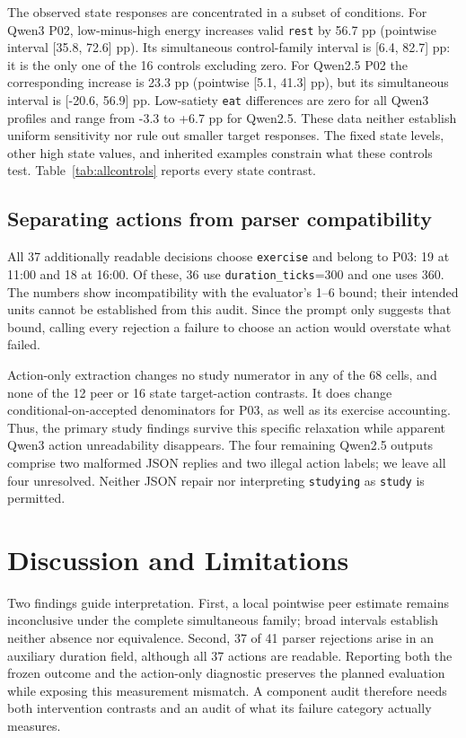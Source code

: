 \documentclass[conference]{IEEEtran}
\newcommand{\code}[1]{\texttt{#1}}
\begin{document}
The observed state responses are concentrated in a subset of conditions. For Qwen3 P02, low-minus-high energy increases valid \code{rest} by 56.7 pp (pointwise interval [35.8, 72.6] pp). Its simultaneous control-family interval is [6.4, 82.7] pp: it is the only one of the 16 controls excluding zero. For Qwen2.5 P02 the corresponding increase is 23.3 pp (pointwise [5.1, 41.3] pp), but its simultaneous interval is [-20.6, 56.9] pp. Low-satiety \code{eat} differences are zero for all Qwen3 profiles and range from -3.3 to +6.7 pp for Qwen2.5. These data neither establish uniform sensitivity nor rule out smaller target responses. The fixed state levels, other high state values, and inherited examples constrain what these controls test. Table~\ref{tab:allcontrols} reports every state contrast.

\subsection{Separating actions from parser compatibility}


All 37 additionally readable decisions choose \code{exercise} and belong to P03: 19 at 11:00 and 18 at 16:00. Of these, 36 use \code{duration\_ticks}=300 and one uses 360. The numbers show incompatibility with the evaluator's 1--6 bound; their intended units cannot be established from this audit. Since the prompt only suggests that bound, calling every rejection a failure to choose an action would overstate what failed.

Action-only extraction changes no study numerator in any of the 68 cells, and none of the 12 peer or 16 state target-action contrasts. It does change conditional-on-accepted denominators for P03, as well as its exercise accounting. Thus, the primary study findings survive this specific relaxation while apparent Qwen3 action unreadability disappears. The four remaining Qwen2.5 outputs comprise two malformed JSON replies and two illegal action labels; we leave all four unresolved. Neither JSON repair nor interpreting \code{studying} as \code{study} is permitted.

\section{Discussion and Limitations}
Two findings guide interpretation. First, a local pointwise peer estimate remains inconclusive under the complete simultaneous family; broad intervals establish neither absence nor equivalence. Second, 37 of 41 parser rejections arise in an auxiliary duration field, although all 37 actions are readable. Reporting both the frozen outcome and the action-only diagnostic preserves the planned evaluation while exposing this measurement mismatch. A component audit therefore needs both intervention contrasts and an audit of what its failure category actually measures.
\end{document}
